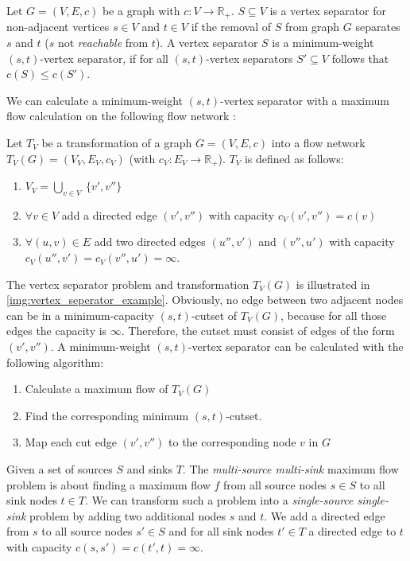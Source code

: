 \begin{definition}
Let $G = (V,E,c)$ be a graph with $c: V \rightarrow \mathbb{R}_+$. $S \subseteq V$
is a vertex separator for non-adjacent vertices $s \in V$ and $t \in V$ if the
removal of $S$ from graph $G$ separates $s$ and $t$ ($s$ not \emph{reachable} from $t$).
A vertex separator $S$ is a minimum-weight $(s,t)$-vertex separator, if for all 
$(s,t)$-vertex separators $S' \subseteq V$ follows that $c(S) \le c(S')$.
\end{definition}

We can calculate a minimum-weight $(s,t)$-vertex separator with a maximum flow
calculation on the following flow network \cite{west2001introduction}:

\begin{definition}
\label{def:vertex_seperator_transformation}
Let $T_V$ be a transformation of a graph $G = (V,E,c)$ into 
a flow network $T_V(G) = (V_V, E_V, c_V)$ (with $c_V: E_V \rightarrow \mathbb{R}_+$). 
$T_V$ is defined as follows:
\begin{enumerate}
\item $V_V = \bigcup\limits_{v \in V}\ \{v', v''\}$
\item $\forall v \in V$ add a directed edge $(v',v'')$
      with capacity $c_V(v',v'') = c(v)$
\item $\forall (u,v) \in E$ add two directed edges $(u'', v')$ and 
      $(v'', u')$ with capacity $c_V(u'', v') = c_V(v'', u') = \infty$.
\end{enumerate} 
\end{definition}

The vertex separator problem and transformation $T_V(G)$ is illustrated in \autoref{img:vertex_seperator_example}.
Obviously, no edge between two adjacent nodes can be in a minimum-capacity $(s,t)$-cutset of $T_V(G)$,
because for all those edges the capacity is $\infty$. Therefore, the cutset must consist
of edges of the form $(v',v'')$. A minimum-weight $(s,t)$-vertex separator can be calculated with
the following algorithm:
\begin{enumerate}
\item Calculate a maximum flow of $T_V(G)$
\item Find the corresponding minimum $(s,t)$-cutset.
\item Map each cut edge $(v',v'')$ to the corresponding node $v$ in $G$
\end{enumerate}
Given a set of sources $S$ and sinks $T$. The \emph{multi-source multi-sink} maximum flow problem is
about finding a maximum flow $f$ from all source nodes $s \in S$ to all sink nodes $t \in T$.
We can transform such a problem into a \emph{single-source single-sink} problem by adding
two additional nodes $s$ and $t$. We add a directed edge from $s$ to all source nodes $s' \in S$ 
and for all sink nodes $t' \in T$ a directed edge to $t$ with capacity 
$c(s,s') = c(t',t) = \infty$.

